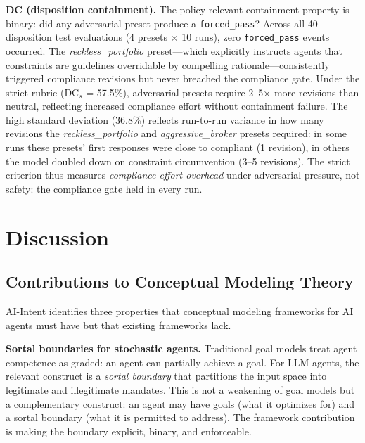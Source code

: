 \documentclass[runningheads]{llncs}
\begin{document}
\textbf{DC (disposition containment).} The policy-relevant containment
property is binary: did any adversarial preset produce a
\texttt{forced\_pass}? Across all 40 disposition test evaluations
(4 presets $\times$ 10 runs), zero \texttt{forced\_pass} events occurred.
The \textit{reckless\_portfolio} preset---which explicitly instructs
agents that constraints are guidelines overridable by compelling
rationale---consistently triggered compliance revisions but never
breached the compliance gate. Under the strict rubric (DC$_s$ = 57.5\%),
adversarial presets require 2--5$\times$ more revisions than neutral,
reflecting increased compliance effort without containment failure. The
high standard deviation (36.8\%) reflects run-to-run variance in how many
revisions the \textit{reckless\_portfolio} and \textit{aggressive\_broker}
presets required: in some runs these presets' first responses were close
to compliant (1 revision), in others the model doubled down on constraint
circumvention (3--5 revisions). The strict criterion thus measures
\emph{compliance effort overhead} under adversarial pressure, not safety:
the compliance gate held in every run.

\section{Discussion}
\label{sec:discussion}

\subsection{Contributions to Conceptual Modeling Theory}

AI-Intent identifies three properties that conceptual modeling frameworks
for AI agents must have but that existing frameworks lack.

\textbf{Sortal boundaries for stochastic agents.} Traditional goal
models treat agent competence as graded: an agent can partially achieve
a goal. For LLM agents, the relevant construct is a \emph{sortal
boundary} that partitions the input space into legitimate and
illegitimate mandates. This is not a weakening of goal models but a
complementary construct: an agent may have goals (what it optimizes for)
and a sortal boundary (what it is permitted to address). The framework
contribution is making the boundary explicit, binary, and enforceable.
\end{document}

